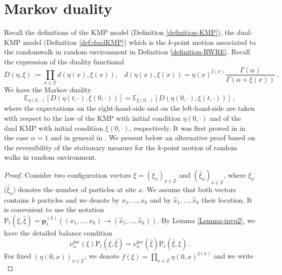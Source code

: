 \documentclass[a4paper,11pt,oneside,reqno]{amsart}
\theoremstyle{definition}
\numberwithin{equation}{section}
\begin{document}
{\color{black} 
\section{Markov duality}
\label{sec:proofduality}
Recall the definitions of the KMP model (Definition \ref{definition-KMP}), the dual-KMP model (Definition \ref{def:dualKMP}) which is the $k$-point motion associated to the randomwalk in random environment in Definition \ref{definition-RWRE}.  Recall the expression of the duality functional 
\begin{equation*}
	D(\eta,\xi):=\prod_{x\in \mathbb{Z}}d(\eta(x),\xi(x)), \hspace{10pt}
	d(\eta(x),\xi(x))=\eta(x)^{\xi(x)}\frac{\Gamma(\alpha)}{\Gamma(\alpha+\xi(x))}\,.
\end{equation*}
We have the Markov duality 
\begin{equation}
	\mathbb E_{\eta(0,\cdot)}\left[ D(\eta(t,\cdot),\xi(0,\cdot))\right]=\mathbb E_{\xi(0,\cdot)}\left[ D(\eta(0,\cdot),\xi(t,\cdot))\right]\,,
\end{equation}
where the expectations on the right-hand-side and on the left-hand-side are taken with respect to the law of the KMP with initial condition $\eta(0,\cdot)$ and of the dual KMP with initial condition $\xi(0,\cdot)$, respectively. It was first proved in \cite{kipnis1982heat}  in the case $\alpha=1$ and in general in \cite{modelsOfTransport}. We present below an alternative proof based on the reversibility of the  stationary measure for the $k$-point motion of random walks in random environment. 
\begin{proof}
	Consider two configuration vectors $\xi=(\xi_{x})_{x\in\mathbb{Z}}$ and $(\hat{\xi}_{x})_{x\in \mathbb{Z}}$, where $\xi_{x}$ ($\hat{\xi}_{x}$) denotes the number of particles at site $x$. We assume that both vectors contains $k$ particles and we denote by $x_{1},\ldots, x_{k}$ and by $\hat{x}_{1},\ldots,\hat{x}_{k}$ their location. It is convenient to use the notation    $\mathrm{P}_{t}(\xi,\hat{\xi})=\mathbf{p}_{t}^{(k)}((x_{1},\ldots,x_{k})\to (\hat{x}_{1},\ldots,\hat{x}_{k}))$. By Lemma \ref{Lemma-invp2}, we have the detailed balance condition
	\begin{equation*}
		\nu^{\text{inv}}_{\alpha}(\xi)\mathrm{P}_{t}(\xi,\hat{\xi})=\nu^{\text{inv}}_{\alpha}(\hat{\xi})\mathrm{P}_{t}(\hat{\xi},\xi)\,.
	\end{equation*}
For fixed $(\eta(0,x))_{x\in \mathbb{Z}}$, we denote $f(\xi)=\prod_{x\in\mathbb{Z}}\eta(0,x)^{\xi(x)}$ and we write 
	\begin{equation*}

\end{equation*}
\end{proof}}
\end{document}
